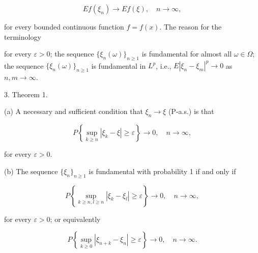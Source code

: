 $$E f(\xi_n) \rightarrow E f(\xi), \quad n \to \infty,$$

for every bounded continuous function $f = f(x)$. The reason for the terminology

for every $\varepsilon > 0$; the sequence $\{\xi_n(\omega)\}_{n \geq 1}$ is fundamental for almost all $\omega \in \Omega$; the sequence $\{\xi_n(\omega)\}_{n \geq 1}$ is fundamental in $L^p$, i.e., $E |\xi_n - \xi_m|^p \to 0$ as $n, m \to \infty$.

3. Theorem 1.

(a) A necessary and sufficient condition that $\xi_n \to \xi$ (P-a.s.) is that

$$P \left\{ \sup_{k \geq n} |\xi_k - \xi| \geq \varepsilon \right\} \to 0, \quad n \to \infty,$$

for every $\varepsilon > 0$.

(b) The sequence $\{\xi_n\}_{n \geq 1}$ is fundamental with probability 1 if and only if

$$P \left\{ \sup_{k \geq n, l \geq n} |\xi_k - \xi_l| \geq \varepsilon \right\} \to 0, \quad n \to \infty,$$

for every $\varepsilon > 0$; or equivalently

$$P \left\{ \sup_{k \geq 0} |\xi_{n+k} - \xi_n| \geq \varepsilon \right\} \to 0, \quad n \to \infty.$$
